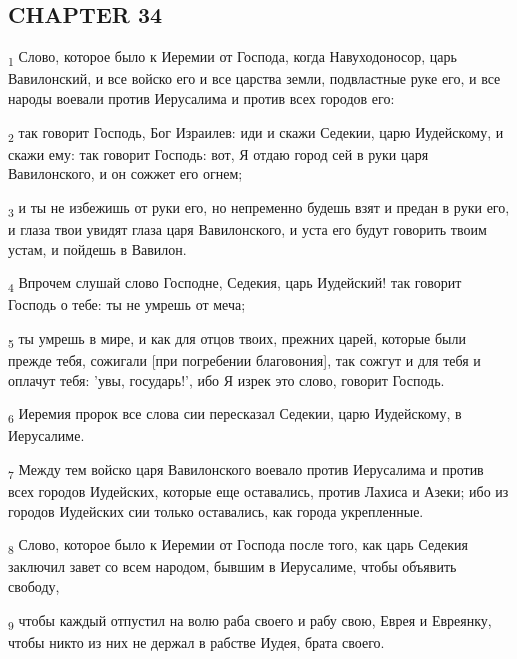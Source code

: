 \subsection{CHAPTER 34}
\begin{tcolorbox}
\textsubscript{1} Слово, которое было к Иеремии от Господа, когда Навуходоносор, царь Вавилонский, и все войско его и все царства земли, подвластные руке его, и все народы воевали против Иерусалима и против всех городов его:
\end{tcolorbox}
\begin{tcolorbox}
\textsubscript{2} так говорит Господь, Бог Израилев: иди и скажи Седекии, царю Иудейскому, и скажи ему: так говорит Господь: вот, Я отдаю город сей в руки царя Вавилонского, и он сожжет его огнем;
\end{tcolorbox}
\begin{tcolorbox}
\textsubscript{3} и ты не избежишь от руки его, но непременно будешь взят и предан в руки его, и глаза твои увидят глаза царя Вавилонского, и уста его будут говорить твоим устам, и пойдешь в Вавилон.
\end{tcolorbox}
\begin{tcolorbox}
\textsubscript{4} Впрочем слушай слово Господне, Седекия, царь Иудейский! так говорит Господь о тебе: ты не умрешь от меча;
\end{tcolorbox}
\begin{tcolorbox}
\textsubscript{5} ты умрешь в мире, и как для отцов твоих, прежних царей, которые были прежде тебя, сожигали [при погребении благовония], так сожгут и для тебя и оплачут тебя: 'увы, государь!', ибо Я изрек это слово, говорит Господь.
\end{tcolorbox}
\begin{tcolorbox}
\textsubscript{6} Иеремия пророк все слова сии пересказал Седекии, царю Иудейскому, в Иерусалиме.
\end{tcolorbox}
\begin{tcolorbox}
\textsubscript{7} Между тем войско царя Вавилонского воевало против Иерусалима и против всех городов Иудейских, которые еще оставались, против Лахиса и Азеки; ибо из городов Иудейских сии только оставались, как города укрепленные.
\end{tcolorbox}
\begin{tcolorbox}
\textsubscript{8} Слово, которое было к Иеремии от Господа после того, как царь Седекия заключил завет со всем народом, бывшим в Иерусалиме, чтобы объявить свободу,
\end{tcolorbox}
\begin{tcolorbox}
\textsubscript{9} чтобы каждый отпустил на волю раба своего и рабу свою, Еврея и Евреянку, чтобы никто из них не держал в рабстве Иудея, брата своего.
\end{tcolorbox}
